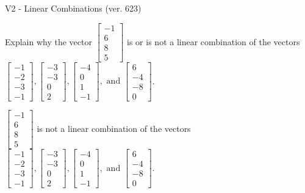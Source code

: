 \begin{exercise}
  \begin{exerciseTitle}V2 - Linear Combinations (ver. 623)\end{exerciseTitle}
  \begin{exerciseStatement}
    Explain why the vector \(\left[\begin{array}{c}
-1 \\
6 \\
8 \\
5
\end{array}\right]\)  is or is not a linear 
	combination of the vectors \(\left[\begin{array}{c}
-1 \\
-2 \\
-3 \\
-1
\end{array}\right] , \left[\begin{array}{c}
-3 \\
-3 \\
0 \\
2
\end{array}\right] , \left[\begin{array}{c}
-4 \\
0 \\
1 \\
-1
\end{array}\right] , \text{ and } \left[\begin{array}{c}
6 \\
-4 \\
-8 \\
0
\end{array}\right]\).
	


  \end{exerciseStatement}
  \begin{exerciseAnswer}
   \(\left[\begin{array}{c}
-1 \\
6 \\
8 \\
5
\end{array}\right]\) 
  	 is not  
	a linear combination of the vectors \(\left[\begin{array}{c}
-1 \\
-2 \\
-3 \\
-1
\end{array}\right] , \left[\begin{array}{c}
-3 \\
-3 \\
0 \\
2
\end{array}\right] , \left[\begin{array}{c}
-4 \\
0 \\
1 \\
-1
\end{array}\right] , \text{ and } \left[\begin{array}{c}
6 \\
-4 \\
-8 \\
0
\end{array}\right]\).


\end{exerciseAnswer}
\end{exercise}
